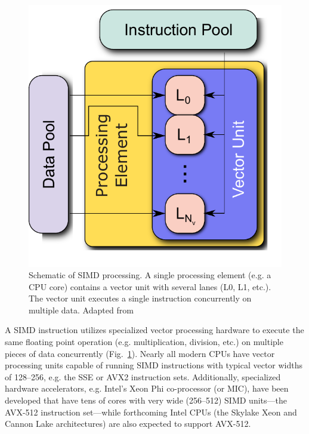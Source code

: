 \documentclass[12pt]{ussci}
\begin{document}
\begin{figure}[h]
	\centering
	\includegraphics[width=0.33\linewidth]{SIMD.pdf}
	\caption{Schematic of SIMD processing.  A single processing element (e.g. a CPU core) contains a vector unit with several lanes (L0, L1, etc.).  The vector unit executes a single instruction concurrently on multiple data. Adapted from\cite{Simdfig:2016}}
	\label{F:SIMD}
\end{figure}

A SIMD instruction utilizes specialized vector processing hardware to execute the same floating point operation (e.g. multiplication, division, etc.) on multiple pieces of data concurrently (Fig.~\ref{F:SIMD}).
Nearly all modern CPUs have vector processing units capable of running SIMD instructions with typical vector widths of \SIrange{128}{256}{\bit}, e.g. the SSE or AVX2 instruction sets.
Additionally, specialized hardware accelerators, e.g. Intel's Xeon Phi co-processor (or MIC), have been developed that have tens of cores with very wide (\SIrange{256}{512}{\bit}) SIMD units---the AVX-512 instruction set---while forthcoming Intel CPUs (the Skylake Xeon and Cannon Lake architectures) are also expected to support AVX-512.
\end{document}
